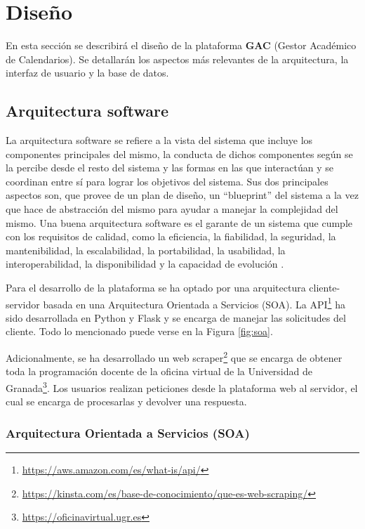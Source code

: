 \chapter{Diseño}
En esta sección se describirá el diseño de la plataforma \textbf{GAC} (Gestor Académico de Calendarios). Se detallarán los aspectos más relevantes de la arquitectura, la interfaz de usuario y la base de datos.

\section{Arquitectura software}
La arquitectura software se refiere a la vista del sistema que incluye los componentes principales del mismo, la conducta de dichos componentes según se la percibe desde el resto del sistema y las formas en las que interactúan y se coordinan entre sí para lograr los objetivos del sistema. Sus dos principales aspectos son, que provee de un plan de diseño, un ``blueprint'' del sistema a la vez que hace de abstracción del mismo para ayudar a manejar la complejidad del mismo. Una buena arquitectura software es el garante de un sistema que cumple con los requisitos de calidad, como la eficiencia, la fiabilidad, la seguridad, la mantenibilidad, la escalabilidad, la portabilidad, la usabilidad, la interoperabilidad, la disponibilidad y la capacidad de evolución \cite{hofmeister2000applied, reynoso2004introduccion, garlan2008software}.\newline

Para el desarrollo de la plataforma se ha optado por una arquitectura cliente-servidor basada en una Arquitectura Orientada a Servicios (SOA). La API\footnote{\url{https://aws.amazon.com/es/what-is/api/}} ha sido desarrollada en Python y Flask y se encarga de manejar las solicitudes del cliente. Todo lo mencionado puede verse en la Figura \ref{fig:soa}.\newline

\newpage

Adicionalmente, se ha desarrollado un web scraper\footnote{\url{https://kinsta.com/es/base-de-conocimiento/que-es-web-scraping/}} que se encarga de obtener toda la programación docente de la oficina virtual de la Universidad de Granada\footnote{\url{https://oficinavirtual.ugr.es}}. Los usuarios realizan peticiones desde la plataforma web al servidor, el cual se encarga de procesarlas y devolver una respuesta.\newline

\subsection{Arquitectura Orientada a Servicios (SOA)}

